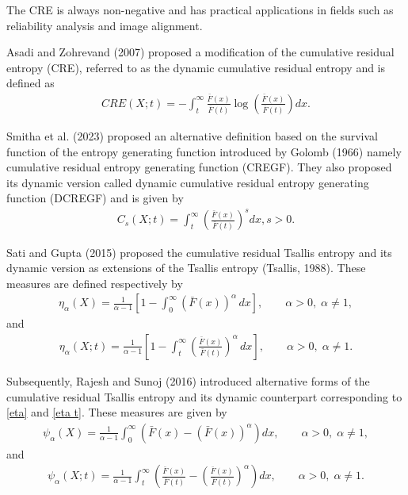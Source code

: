 \documentclass[11pt,reqno]{amsart}
\theoremstyle{tight}
\begin{document}
  The CRE is always non-negative and has practical applications in fields such as reliability analysis and image alignment.
 \par Asadi and Zohrevand (2007) proposed a modification of the cumulative residual entropy (CRE), referred to as the dynamic cumulative residual entropy and is defined as
 \begin{align}\label{CREt}
 CRE(X;t)=-\int_{t}^{\infty} \frac{\bar{F}(x)} {\bar{F}(t)} \log \left( \frac{\bar{F}(x)}{\bar{F}(t)} \right) dx.
 \end{align}
  \par Smitha et al. (2023) proposed an alternative definition based on the survival function of the entropy generating function introduced by Golomb (1966) namely cumulative residual entropy generating function (CREGF). They also proposed its dynamic version called dynamic cumulative residual entropy generating function (DCREGF) and is given by\\
  \begin{align}\label{C(s)}
  C_s{(X;t)}=\int_t^\infty\left(\frac{\bar{F}(x)}{\bar{F}(t)}\right)^s dx, s>0.
 \end{align}

 Sati and Gupta (2015) proposed the cumulative residual Tsallis entropy and its dynamic version as extensions of the Tsallis entropy (Tsallis, 1988). These measures are defined respectively by
\begin{align}\label{eta}
\eta_{\alpha}(X)
= \frac{1}{\alpha-1}
\left[
1-\int_{0}^{\infty} (\bar{F}(x))^{\alpha}\,dx
\right],
\qquad \alpha>0,\; \alpha\neq 1,
\end{align}
and
\begin{align}\label{eta t}
\eta_{\alpha}(X;t)
= \frac{1}{\alpha-1}
\left[
1-\int_{t}^{\infty}
\left(
\frac{\bar{F}(x)}{\bar{F}(t)}
\right)^{\alpha}
\,dx
\right],
\qquad \alpha>0,\; \alpha\neq 1.
\end{align}

Subsequently, Rajesh and Sunoj (2016) introduced alternative forms of the cumulative residual Tsallis entropy and its dynamic counterpart corresponding to \eqref{eta} and \eqref{eta t}. These measures are given by
\begin{align}\label{a eta}
\psi_{\alpha}(X)
= \frac{1}{\alpha-1}
\int_{0}^{\infty}
\left(
\bar{F}(x)-(\bar{F}(x))^{\alpha}
\right)dx,
\qquad \alpha>0,\; \alpha\neq 1,
\end{align}
and
\begin{align}\label{a eta t}
\psi_{\alpha}(X;t)
= \frac{1}{\alpha-1}
\int_{t}^{\infty}
\left(
\frac{\bar{F}(x)}{\bar{F}(t)}
-
\left(
\frac{\bar{F}(x)}{\bar{F}(t)}
\right)^{\alpha}
\right)dx,
\qquad \alpha>0,\; \alpha\neq 1.
\end{align}
\end{document}
